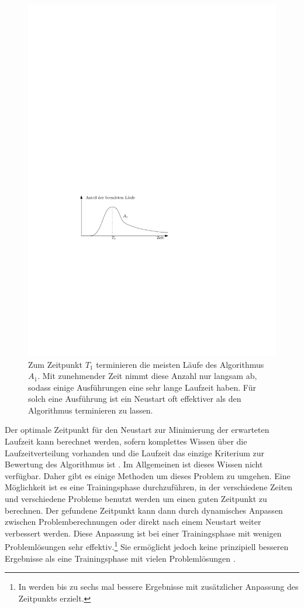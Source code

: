 \begin{figure}[h]
\centering
\includegraphics{heavytailed.pdf}
\caption[Heavy-Tailed Laufzeitverteilung]{Zum Zeitpunkt $T_1$ terminieren die meisten Läufe des Algorithmus $A_1$. Mit zunehmender Zeit nimmt diese Anzahl nur langsam ab, sodass einige Ausführungen eine sehr lange Laufzeit haben. Für solch eine Ausführung ist ein Neustart oft effektiver als den Algorithmus terminieren zu lassen.}
\label{heavytailed}
\end{figure}

Der optimale Zeitpunkt für den Neustart zur Minimierung der erwarteten Laufzeit kann berechnet werden, sofern komplettes Wissen über die Laufzeitverteilung vorhanden und die Laufzeit das einzige Kriterium zur Bewertung des Algorithmus ist \cite{kautz02}. Im Allgemeinen ist dieses Wissen nicht verfügbar. Daher gibt es einige Methoden um dieses Problem zu umgehen. Eine Möglichkeit ist es eine Trainingsphase durchzuführen, in der verschiedene Zeiten und verschiedene Probleme benutzt werden um einen guten Zeitpunkt zu berechnen. Der gefundene Zeitpunkt kann dann durch dynamisches Anpassen zwischen Problemberechnungen oder direkt nach einem Neustart weiter verbessert werden. Diese Anpassung ist bei einer Trainingsphase mit wenigen Problemlösungen sehr effektiv.\footnote{In \cite{gaglioloschmidhuber07} werden bis zu sechs mal bessere Ergebnisse mit zusätzlicher Anpassung des Zeitpunkts erzielt.} Sie ermöglicht jedoch keine prinzipiell besseren Ergebnisse als eine Trainingsphase mit vielen Problemlösungen \cite{fukunaga99}. 

